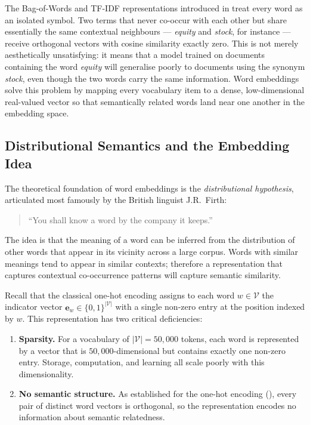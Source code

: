 \begin{deepdive}

The Bag-of-Words and TF-IDF representations introduced in
 treat every word as an isolated symbol.
Two terms that never co-occur with each other but share essentially
the same contextual neighbours — \emph{equity} and \emph{stock}, for
instance — receive orthogonal vectors with cosine similarity exactly
zero.  This is not merely aesthetically unsatisfying: it means that a
model trained on documents containing the word \emph{equity} will
generalise poorly to documents using the synonym \emph{stock}, even
though the two words carry the same information.  Word embeddings solve
this problem by mapping every vocabulary item to a dense, low-dimensional
real-valued vector so that semantically related words land near one
another in the embedding space.

\subsection{Distributional Semantics and the Embedding Idea}
\label{sec:embeddings-idea}

The theoretical foundation of word embeddings is the
\emph{distributional hypothesis}, articulated most famously by the
British linguist J.R.\ Firth:
\begin{quote}
  ``You shall know a word by the company it keeps.''
  \hfill\cite{firth1957} %
\end{quote}
The idea is that the meaning of a word can be inferred from the
distribution of other words that appear in its vicinity across a large
corpus.  Words with similar meanings tend to appear in similar
contexts; therefore a representation that captures contextual
co-occurrence patterns will capture semantic similarity.

Recall that the classical one-hot encoding assigns to each word
$w \in \mathcal{V}$ the indicator vector $\mathbf{e}_w \in \{0,1\}^{|\mathcal{V}|}$
with a single non-zero entry at the position indexed by $w$.  This
representation has two critical deficiencies:
\begin{enumerate}
  \item \textbf{Sparsity.} For a vocabulary of $|\mathcal{V}| = 50{,}000$ tokens,
        each word is represented by a vector that is $50{,}000$-dimensional
        but contains exactly one non-zero entry.  Storage, computation, and
        learning all scale poorly with this dimensionality.
  \item \textbf{No semantic structure.} As established for the one-hot encoding
        (), every pair of distinct word vectors is orthogonal, so the
        representation encodes no information about semantic relatedness.
\end{enumerate}


\end{deepdive}

